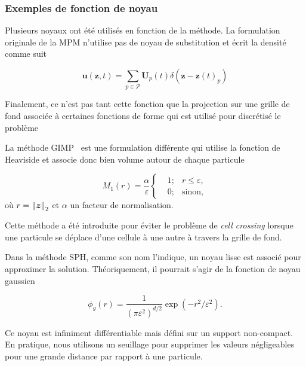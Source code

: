 \subsubsection{Exemples de fonction de noyau}

Plusieurs noyaux ont été utilisés en fonction de la méthode. La formulation originale de la MPM n'utilise pas de noyau de substitution et écrit la densité comme suit

\begin{equation*}
    \bm{u}(\bm{z}, t) = \sum_{p \in \mathcal P} \bm{U}_p(t) \delta (\bm{z}-\bm{z}(t)_p)
\end{equation*}

Finalement, ce n'est pas tant cette fonction que la projection sur une grille de fond associée à certaines fonctions de forme qui est utilisé pour discrétisé le problème~\cite{sulsky_particle_1994}

La méthode GIMP~\cite{bardenhagen_generalized_2004} est une formulation différente qui utilise la fonction de Heaviside et associe donc bien volume autour de chaque particule

\begin{equation*}
    M_1(r) = \frac{\alpha}{\varepsilon}\left\{\begin{aligned}
         & 1; & r \leq \varepsilon, \\
         & 0; & \text{sinon},
    \end{aligned}
    \right.
\end{equation*}où $r = \norm{\bm{z}}_2$ et $\alpha$ un facteur de normalisation.

Cette méthode a été introduite pour éviter le problème de \textit{cell crossing} lorsque une particule se déplace d'une cellule à une autre à travers la grille de fond.

Dans la méthode SPH, comme son nom l'indique, un noyau lisse est associé pour approximer la solution. Théoriquement, il pourrait s'agir de la fonction de noyau gaussien

\begin{equation*}
    \phi_g(r) = \frac{1}{{(\pi \varepsilon^2)}^{d/2}} \exp(-r^2/\varepsilon^2).
\end{equation*}

Ce noyau est infiniment différentiable mais défini sur un support non-compact. En pratique, nous utilisons un seuillage pour supprimer les valeurs négligeables pour une grande distance par rapport à une particule.

